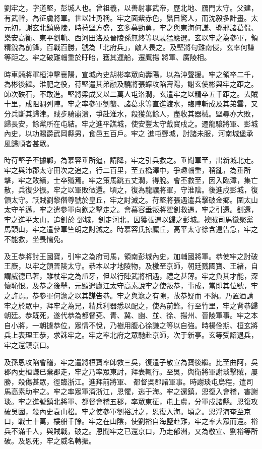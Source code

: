 \begin{pinyinscope}
 劉牢之，字道堅，彭城人也。曾祖羲，以善射事武帝，歷北地、鴈門太守。父建，有武幹，為征虜將軍。世以壯勇稱。牢之面紫赤色，鬚目驚人，而沈毅多計畫。太元初，謝玄北鎮廣陵，時苻堅方盛，玄多募勁勇，牢之與東海何謙、瑯邪諸葛侃、樂安高衡、東平劉軌、西河田洛及晉陵孫無終等以驍猛應選。玄以牢之為參軍，領精銳為前鋒，百戰百勝，號為「北府兵」，敵人畏之。及堅將句難南侵，玄率何謙等距之。牢之破難輜重於盱眙，獲其運船，遷鷹揚
 將軍、廣陵相。



 時車騎將軍桓沖擊襄陽，宣城內史胡彬率眾向壽陽，以為沖聲援。牢之領卒二千，為彬後繼。淮肥之役，苻堅遣其弟融及驍將張蠔攻陷壽陽，謝玄使彬與牢之距之。師次硤石，不敢進。堅將梁成又以二萬人屯洛澗，玄遣牢之以精卒五千距之。去賊十里，成阻澗列陣。牢之率參軍劉襲、諸葛求等直進渡水，臨陣斬成及其弟雲，又分兵斷其歸津。賊步騎崩潰，爭赴淮水，殺獲萬餘人，盡收其器械。堅尋亦大敗，歸長安，餘黨所在屯結。牢之進平譙城，使安豐太守戴寶戍之。遷龍驤將軍、彭城內史，以功賜爵武岡縣男，食邑五百戶。牢之
 進屯鄄城，討諸未服，河南城堡承風歸順者甚眾。



 時苻堅子丕據鄴，為慕容垂所逼，請降，牢之引兵救之。垂聞軍至，出新城北走。牢之與沛郡太守田次之追之，行二百里，至五橋澤中，爭趣輜重，稍亂，為垂所擊，牢之敗績，士卒殲焉。牢之策馬跳五丈澗，得脫。會丕救至，因入臨漳，集亡散，兵復少振。牢之以軍敗徵還。頃之，復為龍驤將軍，守淮陰。後進戍彭城，復領太守。祅賊劉黎僭尊號於皇丘，牢之討滅之。苻堅將張遇遣兵擊破金鄉。圍太山太守羊邁，牢之遣參軍向欽之擊走之。會慕容垂叛將翟釗救遇，牢之引還。釗還，牢之進平太山，追釗於
 鄄城，釗走河北，因獲張遇以歸之彭城。襖賊司馬徽聚黨馬頭山，牢之遣參軍竺朗之討滅之。時慕容氏掠廩丘，高平太守徐含遠告急，牢之不能救，坐畏懦免。



 及王恭將討王國寶，引牢之為府司馬，領南彭城內史，加輔國將軍。恭使牢之討破王廞，以牢之領晉陵太守。恭本以才地陵物，及檄至京師，朝廷戮國寶、王緒，自謂威德已著，雖杖牢之為爪牙，但以行陣武將相遇，禮之甚薄。牢之負其才能，深懷恥恨。及恭之後舉，元顯遣廬江太守高素說牢之使叛恭，事成，當即其位號，牢之許焉。恭參軍何澹之以其謀告恭。牢之與澹之有隙，故恭疑而
 不納。乃置酒請牢之於眾中，拜牢之為兄，精兵利器悉以配之，使為前鋒。行至竹里，牢之背恭歸朝廷。恭既死，遂代恭為都督兗、青、冀、幽、並、徐、揚州、晉陵軍事。牢之本自小將，一朝據恭位，眾情不悅，乃樹用腹心徐謙之等以自強。時楊佺期、桓玄將兵上表理王恭，求誅牢之。牢之率北府之眾馳赴京師，次于新亭。玄等受詔退兵，牢之還鎮京口。



 及孫恩攻陷會稽，牢之遣將桓寶率師救三吳，復遣子敬宣為寶後繼。比至曲阿，吳郡內史桓謙已棄郡走，牢之乃率眾東討，拜表輒行。至吳，與衛將軍謝琰擊賊，屢勝，殺傷甚眾，徑臨浙江。進拜前將軍、
 都督吳郡諸軍事。時謝琰屯烏程，遣司馬高素助牢之。牢之率眾軍濟浙江，恩懼，逃于海。牢之還鎮，恩復入會稽，害謝琰。牢之進號鎮北將軍、都督會稽五郡，率眾東征，屯上虞，分軍戍諸縣。恩復攻破吳國，殺內史袁山松。牢之使參軍劉裕討之，恩復入海。頃之。恩浮海奄至京口，戰士十萬，樓船千餘。牢之在山陰，使劉裕自海鹽赴難，牢之率大眾而還。裕兵不滿千人，與賊戰，破之。恩聞牢之已還京口，乃走郁洲，又為敬宣、劉裕等所破。及恩死，牢之威名轉振。




\end{pinyinscope}
